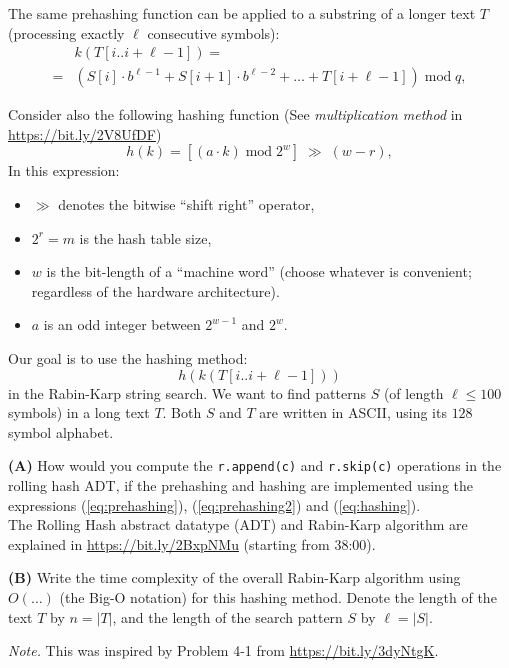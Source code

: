 \documentclass[jou]{apa6}
\begin{document}
The same prehashing function can be applied to a substring of a longer text $T$ (processing 
exactly $\ell$ consecutive symbols): 
{\footnotesize
\begin{align}
 & k(T[i..i+\ell-1]) = \nonumber \\
= & \left(S[i]\cdot{}b^{\ell-1} + S[i+1] \cdot b^{\ell-2} + \ldots + T[i + \ell{} - 1]\right)\;\text{mod}\;q, \label{eq:prehashing2}
\end{align}
}

Consider also the following
hashing function (See {\em multiplication method} in \url{https://bit.ly/2V8UfDF})
\begin{equation}
\label{eq:hashing}
h(k) = \left[ (a \cdot k)\;\text{mod}\;2^w \right]\;\gg\;(w - r),
\end{equation}
In this expression:
\begin{itemize}
\item $\gg$ denotes the bitwise ``shift right'' operator,
\item $2^r = m$ is the hash table size,
\item $w$ is the bit-length of a ``machine word'' (choose whatever is 
convenient; regardless of the hardware architecture).
\item $a$ is an odd integer between $2^{w-1}$ and $2^w$.
\end{itemize}

Our goal is to use the hashing method:
$$h(k(T[i..i+\ell-1]))$$
in the Rabin-Karp string search. 
We want to find patterns $S$ (of length $\ell \leq 100$ symbols) in a long text $T$.
Both $S$ and $T$ are written in ASCII, using its $128$ symbol alphabet.

{\bf (A)} How would you compute the {\tt r.append(c)} and {\tt r.skip(c)}
operations in the rolling hash ADT, if the prehashing and hashing are implemented 
using the expressions (\ref{eq:prehashing}), (\ref{eq:prehashing2}) and (\ref{eq:hashing}).\\
The Rolling Hash abstract datatype (ADT) and Rabin-Karp algorithm are explained in \url{https://bit.ly/2BxpNMu} (starting from 38:00).

{\bf (B)} Write the time complexity of the overall Rabin-Karp algorithm using $O(\ldots)$ (the Big-O notation)
for this hashing method. Denote the length of the text $T$ by $n = |T|$, and the length of the search pattern 
$S$ by $\ell = |S|$. 

{\em Note.} This was inspired by Problem 4-1 from \url{https://bit.ly/3dyNtgK}. 
\end{document}

